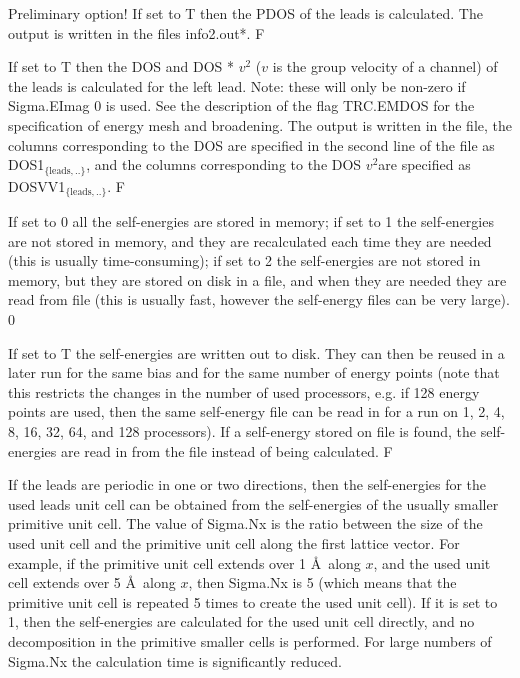 \documentclass[11pt]{article}
\begin{document}
{
{Preliminary option! If set to T then the PDOS of the leads is calculated. The output is written in the files info2.out*.}
{F}

{If set to T then the DOS and DOS * $v^2$ ($v$ is the group velocity of a channel) of the leads is calculated for the left lead. Note: these will only be non-zero if Sigma.EImag 0 is used. See the description of the flag TRC.EMDOS for the specification of energy mesh and broadening. The output is written in the  file, the columns corresponding to the DOS are specified in the second line of the  file as DOS1$_\mathrm{\lbrace leads,..\rbrace}$, and the columns corresponding to the DOS $v^2$are specified as DOSVV1$_\mathrm{\lbrace leads,..\rbrace}$.}
{F}

{If set to 0 all the self-energies are stored in memory; if set to 1 the self-energies are not stored in memory, and they are recalculated each time they are needed (this is usually time-consuming); if set to 2 the self-energies are not stored in memory, but they are stored on disk in a file, and when they are needed they are read from file (this is usually fast, however the self-energy files can be very large).}
{0}

{If set to T the self-energies are written out to disk. They can then be reused in a later run for the same bias and for the same number of energy points (note that this restricts the changes in the number of used processors, e.g. if 128 energy points are used, then the same self-energy file can be read in for a run on 1, 2, 4, 8, 16, 32, 64, and 128 processors). If a self-energy stored on file is found, the self-energies are read in from the file instead of being calculated.}
{F}

{If the leads are periodic in one or two directions, then the self-energies for the used leads unit cell can be obtained from the self-energies of the usually smaller primitive unit cell. The value of Sigma.Nx is the ratio between the size of the used unit cell and the primitive unit cell along the first lattice vector. For example, if the primitive unit cell extends over 1 \AA~along $x$, and the used unit cell extends over 5 \AA~along $x$, then Sigma.Nx is 5 (which means that the primitive unit cell is repeated 5 times to create the used unit cell). If it is set to 1, then the self-energies are calculated for the used unit cell directly, and no decomposition in the primitive smaller cells is performed. For large numbers of Sigma.Nx the calculation time is significantly reduced.

}}
\end{document}

